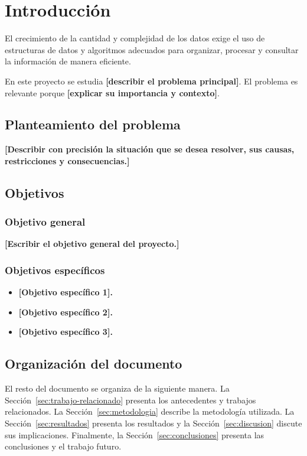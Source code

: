 \section{Introducción}

El crecimiento de la cantidad y complejidad de los datos exige el uso de
estructuras de datos y algoritmos adecuados para organizar, procesar y
consultar la información de manera eficiente.

En este proyecto se estudia \textbf{[describir el problema principal]}.
El problema es relevante porque \textbf{[explicar su importancia y contexto]}.

\subsection{Planteamiento del problema}

\textbf{[Describir con precisión la situación que se desea resolver, sus
causas, restricciones y consecuencias.]}

\subsection{Objetivos}

\subsubsection{Objetivo general}

\textbf{[Escribir el objetivo general del proyecto.]}

\subsubsection{Objetivos específicos}

\begin{itemize}
    \item \textbf{[Objetivo específico 1].}
    \item \textbf{[Objetivo específico 2].}
    \item \textbf{[Objetivo específico 3].}
\end{itemize}

\subsection{Organización del documento}

El resto del documento se organiza de la siguiente manera. La
Sección~\ref{sec:trabajo-relacionado} presenta los antecedentes y trabajos
relacionados. La Sección~\ref{sec:metodologia} describe la metodología
utilizada. La Sección~\ref{sec:resultados} presenta los resultados y la
Sección~\ref{sec:discusion} discute sus implicaciones. Finalmente, la
Sección~\ref{sec:conclusiones} presenta las conclusiones y el trabajo futuro.
